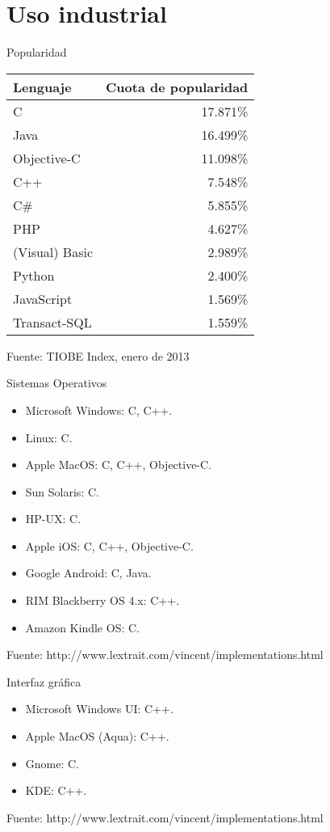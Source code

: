 \section{Uso industrial}

\begin{frame}[t]{Popularidad}
\begin{center}
\begin{tabular}{|l|r|}
\hline
\textbf{Lenguaje} & \textbf{Cuota de popularidad}\\
\hline
C & 17.871\%\\
\hline
Java & 16.499\%\\	
\hline
Objective-C & 11.098\%\\
\hline
C++ & 7.548\%\\
\hline
C\# & 5.855\%\\	
\hline
PHP & 4.627\%\\
\hline
(Visual) Basic & 2.989\%\\
\hline
Python & 2.400\%\\
\hline
JavaScript & 1.569\%\\
\hline
Transact-SQL & 1.559\%\\
\hline
\end{tabular}
\vfill
{\tiny Fuente: TIOBE Index, enero de 2013}
\end{center}
\end{frame}

\begin{frame}[t]{Sistemas Operativos}
  \begin{itemize}
    \item Microsoft Windows: C, C++.
    \item Linux: C.
    \item Apple MacOS: C, C++, Objective-C.
    \item Sun Solaris: C.
    \item HP-UX: C.
    \item Apple iOS: C, C++, Objective-C.
    \item Google Android: C, Java.
    \item RIM Blackberry OS 4.x: C++.
    \item Amazon Kindle	OS: C.
  \end{itemize}
  \vfill
  {\tiny Fuente: http://www.lextrait.com/vincent/implementations.html}
\end{frame}

\begin{frame}[t]{Interfaz gráfica}
  \begin{itemize}
    \item Microsoft Windows UI: C++.
    \item Apple MacOS (Aqua): C++.
    \item Gnome: C.
    \item KDE: C++.
  \end{itemize}
  \vfill
  {\tiny Fuente: http://www.lextrait.com/vincent/implementations.html}
\end{frame}

